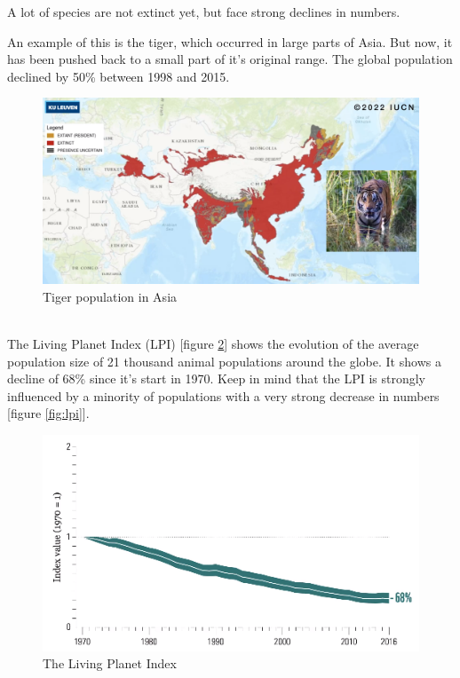 \documentclass[../summary.tex]{subfiles}
\begin{document}
A lot of species are not extinct yet, but face strong declines in numbers.  

An example of this is the tiger, which occurred in large parts of Asia. But now, it has been pushed back to a small part of it's original range.  The global population declined by 50\% between 1998 and 2015.

\begin{figure}[H]
	\centering
	\includegraphics[width=0.9\linewidth]{../images/tiger_population}
	\caption{Tiger population in Asia}
	\label{fig:tigerpopulation}
\end{figure}
\ \\
The Living Planet Index (LPI) [figure \ref{fig:livingplanetindex}] shows the evolution of the average population size of 21 thousand animal populations around the globe. It shows a decline of 68\% since it's start in 1970. Keep in mind that the LPI is strongly influenced by a minority of populations with a very strong decrease in numbers [figure \ref{fig:lpi}].

\begin{figure}[H]
	\centering
	\includegraphics[width=0.8\linewidth]{../images/living_planet_index}
	\caption{The Living Planet Index}
	\label{fig:livingplanetindex}
\end{figure}
\end{document}
